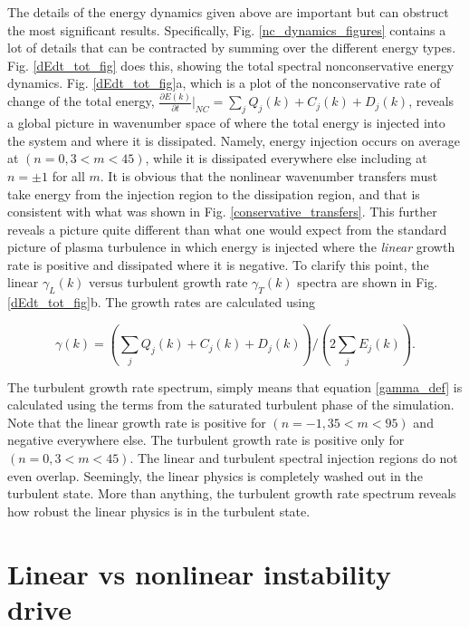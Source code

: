 \documentclass[showpacs,preprintnumbers,amsmath,amssymb,superscriptaddress]{revtex4}
\def\beq{\begin{equation}}
\def\eeq{\end{equation}}
\newcommand{\pdiff}[2]{\frac{\partial#1}{\partial#2}}
\begin{document}
The details of the energy dynamics given above are important but can obstruct the most significant results. Specifically, Fig. \ref{nc_dynamics_figures} contains a lot of details
that can be contracted by summing over the different energy types.
Fig. \ref{dEdt_tot_fig} does this, showing the total spectral nonconservative energy dynamics.
Fig. \ref{dEdt_tot_fig}a, which is a plot of the nonconservative rate of change of the total energy, $ \pdiff{E(k)}{t} \big|_{NC} = \sum_j Q_j(k) + C_j(k) + D_j(k)$, 
reveals a global picture in wavenumber space of
where the total energy is injected into the system and where it is dissipated. Namely, energy injection occurs on average at $(n=0, 3<m<45)$, 
while it is dissipated everywhere else including at $n=\pm 1$ for all $m$. It is obvious that the nonlinear wavenumber transfers must take energy from the injection region to the dissipation
region, and that is consistent with what was shown in Fig. \ref{conservative_transfers}.
This further reveals a picture quite different than what one would expect from the standard picture of plasma turbulence in which energy is 
injected where the \emph{linear} growth rate is positive and dissipated
where it is negative. To clarify this point, the linear $\gamma_L(k)$ versus turbulent growth rate $\gamma_{T}(k)$ spectra are shown in Fig. \ref{dEdt_tot_fig}b. The growth rates are calculated using

\beq
\label{gamma_def}
\gamma(k) = \left( \sum_j Q_j(k) + C_j(k) + D_j(k) \right)/\left( 2 \sum_j E_j(k) \right).
\eeq

The turbulent growth rate spectrum, simply means that equation \ref{gamma_def} is calculated using the terms from the saturated turbulent phase of the simulation.
Note that the linear growth rate is positive for $(n=-1, 35<m<95)$ and negative everywhere else. The turbulent growth rate is positive only
for $(n=0, 3<m<45)$. The linear and turbulent spectral injection regions do not even overlap. Seemingly, the linear physics is completely washed out in the turbulent state. 
More than anything, the turbulent growth rate spectrum reveals how robust the linear physics is in the turbulent state.


\section{Linear vs nonlinear instability drive}
\end{document}
